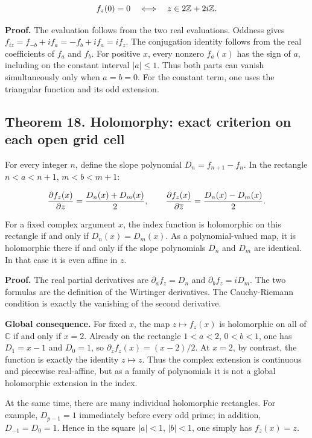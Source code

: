 \documentclass[11pt,a4paper]{article}
\newcommand{\fitmath}[1]{\begingroup\setbox0=\hbox{$\displaystyle #1$}\ifdim\wd0>\linewidth\resizebox{\linewidth}{!}{\box0}\else\box0\fi\endgroup}
\begin{document}
\[
\fitmath{f_z(0)=0\quad\Longleftrightarrow\quad z\in2\mathbb Z+2i\mathbb Z.}
\]


\textbf{Proof.} The evaluation follows from the two real evaluations. Oddness gives $f_{iz}=f_{-b}+if_a=-f_b+if_a=i f_z$. The conjugation identity follows from the real coefficients of $f_a$ and $f_b$. For positive $x$, every nonzero $f_a(x)$ has the sign of $a$, including on the constant interval $|a|\leq1$. Thus both parts can vanish simultaneously only when $a=b=0$. For the constant term, one uses the triangular function and its odd extension.


\subsection*{Theorem 18. Holomorphy: exact criterion on each open grid cell}

For every integer $n$, define the slope polynomial $D_n=f_{n+1}-f_n$. In the rectangle $n<a<n+1$, $m<b<m+1$:


\[
\fitmath{\frac{\partial f_z(x)}{\partial z}=\frac{D_n(x)+D_m(x)}2,\qquad \frac{\partial f_z(x)}{\partial\overline z}=\frac{D_n(x)-D_m(x)}2.}
\]


For a fixed complex argument $x$, the index function is holomorphic on this rectangle if and only if $D_n(x)=D_m(x)$. As a polynomial-valued map, it is holomorphic there if and only if the slope polynomials $D_n$ and $D_m$ are identical. In that case it is even affine in $z$.


\textbf{Proof.} The real partial derivatives are $\partial_a f_z=D_n$ and $\partial_b f_z=iD_m$. The two formulas are the definition of the Wirtinger derivatives. The Cauchy-Riemann condition is exactly the vanishing of the second derivative.


\textbf{Global consequence.} For fixed $x$, the map $z\mapsto f_z(x)$ is holomorphic on all of $\mathbb C$ if and only if $x=2$. Already on the rectangle $1<a<2$, $0<b<1$, one has $D_1=x-1$ and $D_0=1$, so $\partial_{\overline z}f_z(x)=(x-2)/2$. At $x=2$, by contrast, the function is exactly the identity $z\mapsto z$. Thus the complex extension is continuous and piecewise real-affine, but as a family of polynomials it is not a global holomorphic extension in the index.


At the same time, there are many individual holomorphic rectangles. For example, $D_{p-1}=1$ immediately before every odd prime; in addition, $D_{-1}=D_0=1$. Hence in the square $|a|<1$, $|b|<1$, one simply has $f_z(x)=z$.
\end{document}

